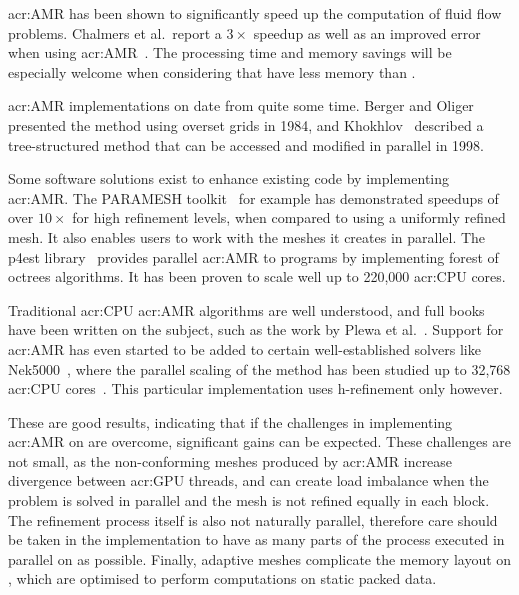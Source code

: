 \Acrshort{acr:AMR} has been shown to significantly speed up the computation of fluid flow problems.
Chalmers et al.\ report a \(3 \times \) speedup as well as an improved error when using
\acrshort{acr:AMR}~\cite{Chalmers2019}. The processing time and memory savings will be especially
welcome when considering that  have less memory than .

\Acrshort{acr:AMR} implementations on  date from quite some time. Berger and
Oliger~\cite{Berger1984} presented the method using overset grids in 1984, and
Khokhlov~\cite{Khokhlov1998} described a tree-structured method that can be accessed and modified in
parallel in 1998.

Some software solutions exist to enhance existing code by implementing \acrlong{acr:AMR}. The
PARAMESH toolkit~\cite{MacNeice2000} for example has demonstrated speedups of over \( 10 \times \)
for high refinement levels, when compared to using a uniformly refined mesh. It also enables users
to work with the meshes it creates in parallel. The p4est library~\cite{Burstedde2011} provides
parallel \acrshort{acr:AMR} to programs by implementing forest of octrees algorithms. It has been
proven to scale well up to 220,000 \acrshort{acr:CPU} cores.

Traditional \acrshort{acr:CPU} \acrshort{acr:AMR} algorithms are well understood, and full books
have been written on the subject, such as the work by Plewa et al.~\cite{Plewa2005}. Support for
\acrshort{acr:AMR} has even started to be added to certain well-established solvers like
Nek5000~\cite{Offermans2019}, where the parallel scaling of the method has been studied up to 32,768
\acrshort{acr:CPU} cores~\cite{Peplinski2016}. This particular implementation uses h-refinement
only however.

These are good results, indicating that if the challenges in implementing \acrshort{acr:AMR} on
 are overcome, significant gains can be expected. These challenges are not
small, as the non-conforming meshes produced by \acrshort{acr:AMR} increase divergence between
\acrshort{acr:GPU} threads, and can create load imbalance when the problem is solved in parallel and
the mesh is not refined equally in each block. The refinement process itself is also not naturally
parallel, therefore care should be taken in the implementation to have as many parts of the process
executed in parallel on  as possible. Finally, adaptive meshes complicate the
memory layout on , which are optimised to perform computations on static packed
data.

